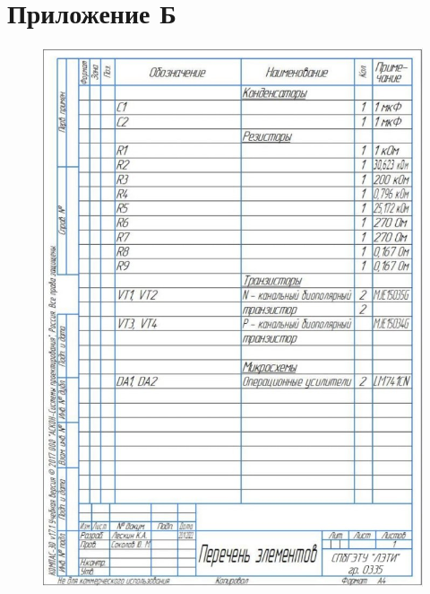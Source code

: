 \section*{Приложение Б}

\begin{figure}[H]
	\centering
	\includegraphics[width=\linewidth]{resources/spec}
\end{figure}